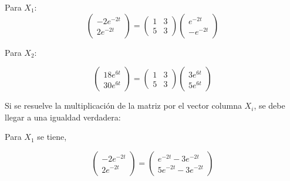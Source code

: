 \documentclass[titlepage]{article}
\begin{document}
            Para $X_1$:    
                \begin{equation*}
                    \begin{pmatrix}
                        -2e^{-2t}\\
                        2e^{-2t}
                    \end{pmatrix} =
                    \begin{pmatrix}
                        1 & 3 \\
                        5 & 3
                    \end{pmatrix}   
                    \begin{pmatrix}
                        e^{-2t} \\
                        -e^{-2t}
                    \end{pmatrix}
                \end{equation*}
                
            Para $X_2$:
                
                \begin{equation*}
                    \begin{pmatrix}
                        18e^{6t}\\
                        30e^{6t}
                    \end{pmatrix} =
                    \begin{pmatrix}
                        1 & 3 \\
                        5 & 3
                    \end{pmatrix}   
                    \begin{pmatrix}
                        3e^{6t} \\
                        5e^{6t}
                    \end{pmatrix}
                \end{equation*}
                
            Si se resuelve la multiplicación de la matriz por el vector columna $X_i$, se debe llegar a una igualdad verdadera:\par\vspace{0.2cm}
            
            Para $X_1$ se tiene,
            
                \begin{equation*}
                    \begin{pmatrix}
                        -2e^{-2t}\\
                        2e^{-2t}
                    \end{pmatrix}=
                    \begin{pmatrix}
                        e^{-2t}-3e^{-2t}\\
                        5e^{-2t}-3e^{-2t}
                    \end{pmatrix}
                \end{equation*}   
                
\end{document}
